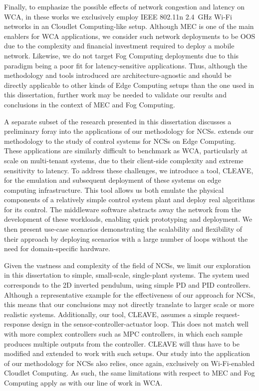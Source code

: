 Finally, to emphasize the possible effects of network congestion and latency on \gls{WCA}, in these works we exclusively employ \acs{IEEE} 802.11n \SI{2.4}{\giga\hertz} Wi-Fi networks in an Cloudlet Computing-like setup.
Although \gls{MEC} is one of the main enablers for \gls{WCA} applications, we consider such network deployments to be \gls{OOS} due to the complexity and financial investment required to deploy a mobile network.
Likewise, we do not target Fog Computing deployments due to this paradigm being a poor fit for latency-sensitive applications.
Thus, although the methodology and tools introduced are architecture-agnostic and should be directly applicable to other kinds of Edge Computing setups than the one used in this dissertation, further work may be needed to validate our results and conclusions in the context of \gls{MEC} and Fog Computing.

\bigskip

A separate subset of the research presented in this dissertation discusses a preliminary foray into the applications of our methodology for \glspl{NCS}.
 extends our methodology to the study of control systems for \glspl{NCS} on Edge Computing.
These applications are similarly difficult to benchmark as \gls{WCA}, particularly at scale on multi-tenant systems, due to their client-side complexity and extreme sensitivity to latency.
To address these challenges, we introduce a tool, \gls{CLEAVE}, for the emulation and subsequent deployment of these systems on edge computing infrastructure.
This tool allows us both emulate the physical components of a relatively simple control system plant and deploy real algorithms for its control.
The middleware software abstracts away the network from the development of these workloads, enabling quick prototyping and deployment.
We then present use-case scenarios demonstrating the scalability and flexibility of their approach by deploying scenarios with a large number of loops without the need for domain-specific hardware.

Given the vastness and complexity of the field of \glspl{NCS}, we limit our exploration in this dissertation to simple, small-scale, single-plant systems.
The system used corresponds to the \gls{2D} inverted pendulum, using simple \gls{PD} and \gls{PID} controllers.
Although a representative example for the effectiveness of our approach for \glspl{NCS}, this means that our conclusions may not directly translate to larger scale or more realistic systems.
Additionally, our tool, \gls{CLEAVE}, assumes a simple request-response design in the sensor-controller-actuator loop.
This does not match well with more complex controllers such as \gls{MPC} controllers, in which each sample produces multiple outputs from the controller.
\gls{CLEAVE} will thus have to be modified and extended to work with such setups.
Our study into the application of our methodology for \glspl{NCS} also relies, once again, exclusively on Wi-Fi-enabled Cloudlet Computing.
As such, the same limitations with respect to \gls{MEC} and Fog Computing apply as with our line of work in \gls{WCA}.

